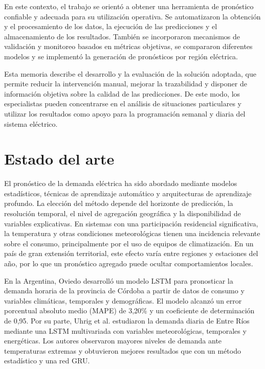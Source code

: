 En este contexto, el trabajo se orientó a obtener una herramienta de pronóstico confiable y adecuada para su utilización operativa. Se automatizaron la obtención y el procesamiento de los datos, la ejecución de las predicciones y el almacenamiento de los resultados. También se incorporaron mecanismos de validación y monitoreo basados en métricas objetivas, se compararon diferentes modelos y se implementó la generación de pronósticos por región eléctrica.

Esta memoria describe el desarrollo y la evaluación de la solución adoptada, que permite reducir la intervención manual, mejorar la trazabilidad y disponer de información objetiva sobre la calidad de las predicciones. De este modo, los especialistas pueden concentrarse en el análisis de situaciones particulares y utilizar los resultados como apoyo para la programación semanal y diaria del sistema eléctrico.





\section{Estado del arte}
\label{sec:estado_arte}

El pronóstico de la demanda eléctrica ha sido abordado mediante modelos estadísticos, técnicas de aprendizaje automático y arquitecturas de aprendizaje profundo. La elección del método depende del horizonte de predicción, la resolución temporal, el nivel de agregación geográfica y la disponibilidad de variables explicativas. En sistemas con una participación residencial significativa, la temperatura y otras condiciones meteorológicas tienen una incidencia relevante sobre el consumo, principalmente por el uso de equipos de climatización. En un país de gran extensión territorial, este efecto varía entre regiones y estaciones del año, por lo que un pronóstico agregado puede ocultar comportamientos locales.

En la Argentina, Oviedo \cite{oviedo2025regional} desarrolló un modelo LSTM para pronosticar la demanda horaria de la provincia de Córdoba a partir de datos de consumo y variables climáticas, temporales y demográficas. El modelo alcanzó un error porcentual absoluto medio (MAPE) de 3,20\% y un coeficiente de determinación de 0,95. Por su parte, Uhrig et al. \cite{uhrig2026multivariate} estudiaron la demanda diaria de Entre Ríos mediante una LSTM multivariada con variables meteorológicas, temporales y energéticas. Los autores observaron mayores niveles de demanda ante temperaturas extremas y obtuvieron mejores resultados que con un método estadístico y una red GRU.

